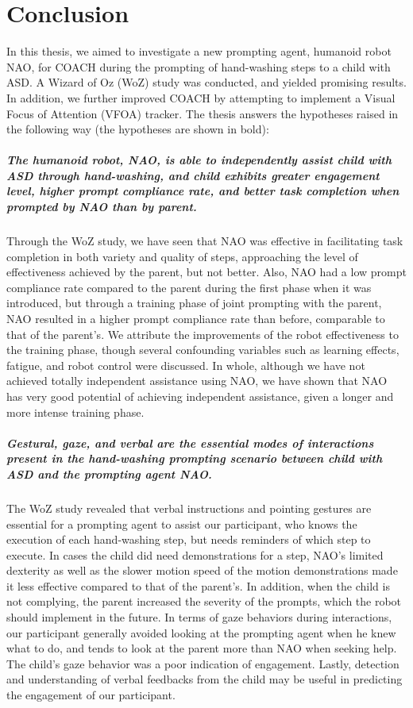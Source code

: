 \chapter{Conclusion}
In this thesis, we aimed to investigate a new prompting agent, humanoid robot NAO, for COACH during the prompting of hand-washing steps to a child with ASD.  A Wizard of Oz (WoZ) study was conducted, and yielded promising results.  In addition, we further improved COACH by attempting to implement a Visual Focus of Attention (VFOA) tracker.  The thesis answers the hypotheses raised in the following way (the hypotheses are shown in bold):

\paragraph{The humanoid robot, NAO, is able to independently assist child with ASD through hand-washing, and child exhibits greater engagement level, higher prompt compliance rate, and better task completion when prompted by NAO than by parent.}
Through the WoZ study, we have seen that NAO was effective in facilitating task completion in both variety and quality of steps, approaching the level of effectiveness achieved by the parent, but not better.  Also, NAO had a low prompt compliance rate compared to the parent during the first phase when it was introduced, but through a training phase of joint prompting with the parent, NAO resulted in a higher prompt compliance rate than before, comparable to that of the parent's.  We attribute the improvements of the robot effectiveness to the training phase, though several confounding variables such as learning effects, fatigue, and robot control were discussed.  In whole, although we have not achieved totally independent assistance using NAO, we have shown that NAO has very good potential of achieving independent assistance, given a longer and more intense training phase.

\paragraph{Gestural, gaze, and verbal are the essential modes of interactions present in the hand-washing prompting scenario between child with ASD and the prompting agent NAO.}
The WoZ study revealed that verbal instructions and pointing gestures are essential for a prompting agent to assist our participant, who knows the execution of each hand-washing step, but needs reminders of which step to execute.  In cases the child did need demonstrations for a step, NAO's limited dexterity as well as the slower motion speed of the motion demonstrations made it less effective compared to that of the parent's.  In addition, when the child is not complying, the parent increased the severity of the prompts, which the robot should implement in the future.  In terms of gaze behaviors during interactions, our participant generally avoided looking at the prompting agent when he knew what to do, and tends to look at the parent more than NAO when seeking help.  The child's gaze behavior was a poor indication of engagement.  Lastly, detection and understanding of verbal feedbacks from the child may be useful in predicting the engagement of our participant.

